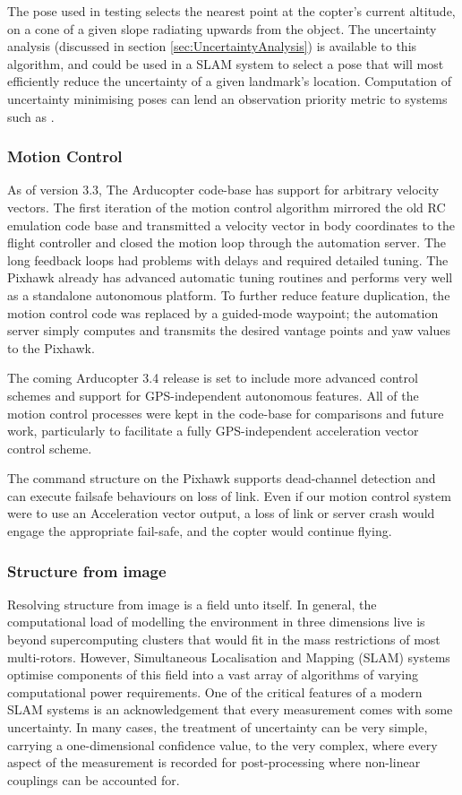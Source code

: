 \documentclass{article}
\begin{document}
      The pose used in testing selects the nearest point at the copter's current altitude, on a cone of a given slope radiating upwards from the object.
      The uncertainty analysis (discussed in section \ref{sec:UncertaintyAnalysis}) is available to this algorithm, and could be used in a SLAM system to select a pose that will most efficiently reduce the uncertainty of a given landmark's location.  Computation of uncertainty minimising poses can lend an observation priority metric to systems such as \cite{TrilatUnderwater}.

    \subsubsection{Motion Control}
      As of version 3.3, The Arducopter code-base has support for arbitrary velocity vectors.  The first iteration of the motion control algorithm mirrored the old RC emulation code base and transmitted a velocity vector in body coordinates to the flight controller and closed the motion loop through the automation server.  The long feedback loops had problems with delays and required detailed tuning.
      The Pixhawk already has advanced automatic tuning routines and performs very well as a standalone autonomous platform.  To further reduce feature duplication, the motion control code was replaced by a guided-mode waypoint; the automation server simply computes and transmits the desired vantage points and yaw values to the Pixhawk.

      The coming Arducopter 3.4 release is set to include more advanced control schemes and support for GPS-independent autonomous features.  All of the motion control processes were kept in the code-base for comparisons and future work, particularly to facilitate a fully GPS-independent acceleration vector control scheme.

      The command structure on the Pixhawk supports dead-channel detection and can execute failsafe behaviours on loss of link.  Even if our motion control system were to use an Acceleration vector output, a loss of link or server crash would engage the appropriate fail-safe, and the copter would continue flying.

    \subsubsection{Structure from image}
      Resolving structure from image is a field unto itself.  In general, the computational load of modelling the environment in three dimensions live is beyond supercomputing clusters that would fit in the mass restrictions of most multi-rotors.  However, Simultaneous Localisation and Mapping (SLAM) systems optimise components of this field into a vast array of algorithms of varying computational power requirements.
      One of the critical features of a modern SLAM systems is an acknowledgement that every measurement comes with some uncertainty. 
      In many cases, the treatment of uncertainty can be very simple, carrying a one-dimensional confidence value, to the very complex, where every aspect of the measurement is recorded for post-processing where non-linear couplings can be accounted for.
\end{document}
